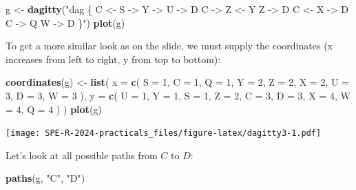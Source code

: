 \documentclass[
]{book}
\newenvironment{Shaded}{\begin{snugshade}}{\end{snugshade}}
\newcommand{\AttributeTok}[1]{\textcolor[rgb]{0.13,0.29,0.53}{#1}}
\newcommand{\DecValTok}[1]{\textcolor[rgb]{0.00,0.00,0.81}{#1}}
\newcommand{\FunctionTok}[1]{\textcolor[rgb]{0.13,0.29,0.53}{\textbf{#1}}}
\newcommand{\NormalTok}[1]{#1}
\newcommand{\OtherTok}[1]{\textcolor[rgb]{0.56,0.35,0.01}{#1}}
\newcommand{\StringTok}[1]{\textcolor[rgb]{0.31,0.60,0.02}{#1}}
\begin{document}
\begin{Shaded}
\begin{Highlighting}[]
\NormalTok{g }\OtherTok{\textless{}{-}} \FunctionTok{dagitty}\NormalTok{(}\StringTok{"dag \{}
\StringTok{    C \textless{}{-} S {-}\textgreater{} Y {-}\textgreater{} U {-}\textgreater{} D}
\StringTok{    C {-}\textgreater{} Z \textless{}{-} Y}
\StringTok{    Z {-}\textgreater{} D}
\StringTok{    C \textless{}{-} X {-}\textgreater{} D}
\StringTok{    C {-}\textgreater{} Q}
\StringTok{    W {-}\textgreater{} D}
\StringTok{  \}"}\NormalTok{)}
\FunctionTok{plot}\NormalTok{(g)}
\end{Highlighting}
\end{Shaded}

To get a more similar look as on the slide, we must supply the coordinates (x increases from left to right, y from top to bottom):

\begin{Shaded}
\begin{Highlighting}[]
\FunctionTok{coordinates}\NormalTok{(g) }\OtherTok{\textless{}{-}} 
  \FunctionTok{list}\NormalTok{(}
    \AttributeTok{x =} 
      \FunctionTok{c}\NormalTok{(}
        \AttributeTok{S =} \DecValTok{1}\NormalTok{, }\AttributeTok{C =} \DecValTok{1}\NormalTok{, }\AttributeTok{Q =} \DecValTok{1}\NormalTok{, }\AttributeTok{Y =} \DecValTok{2}\NormalTok{, }\AttributeTok{Z =} \DecValTok{2}\NormalTok{, }
        \AttributeTok{X =} \DecValTok{2}\NormalTok{, }\AttributeTok{U =} \DecValTok{3}\NormalTok{, }\AttributeTok{D =} \DecValTok{3}\NormalTok{, }\AttributeTok{W =} \DecValTok{3}
\NormalTok{      ),}
    \AttributeTok{y =} 
      \FunctionTok{c}\NormalTok{(}
        \AttributeTok{U =} \DecValTok{1}\NormalTok{, }\AttributeTok{Y =} \DecValTok{1}\NormalTok{, }\AttributeTok{S =} \DecValTok{1}\NormalTok{, }\AttributeTok{Z =} \DecValTok{2}\NormalTok{, }\AttributeTok{C =} \DecValTok{3}\NormalTok{, }
        \AttributeTok{D =} \DecValTok{3}\NormalTok{, }\AttributeTok{X =} \DecValTok{4}\NormalTok{, }\AttributeTok{W =} \DecValTok{4}\NormalTok{, }\AttributeTok{Q =} \DecValTok{4}
\NormalTok{      )}
\NormalTok{  )}
\FunctionTok{plot}\NormalTok{(g)}
\end{Highlighting}
\end{Shaded}

\texttt{[image: SPE-R-2024-practicals\_files/figure-latex/dagitty3-1.pdf]}

Let's look at all possible paths from \(C\) to \(D\):

\begin{Shaded}
\begin{Highlighting}[]
\FunctionTok{paths}\NormalTok{(g, }\StringTok{"C"}\NormalTok{, }\StringTok{"D"}\NormalTok{)}
\end{Highlighting}
\end{Shaded}
\end{document}
